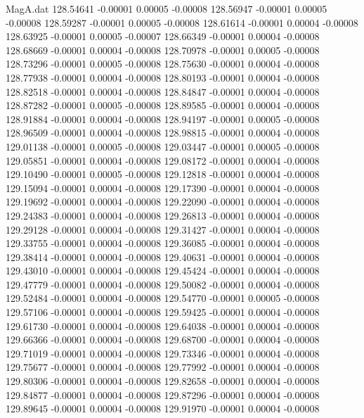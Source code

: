 \begin{filecontents}{MagA.dat}
 128.54641   -0.00001    0.00005   -0.00008
 128.56947   -0.00001    0.00005   -0.00008
 128.59287   -0.00001    0.00005   -0.00008
 128.61614   -0.00001    0.00004   -0.00008
 128.63925   -0.00001    0.00005   -0.00007
 128.66349   -0.00001    0.00004   -0.00008
 128.68669   -0.00001    0.00004   -0.00008
 128.70978   -0.00001    0.00005   -0.00008
 128.73296   -0.00001    0.00005   -0.00008
 128.75630   -0.00001    0.00004   -0.00008
 128.77938   -0.00001    0.00004   -0.00008
 128.80193   -0.00001    0.00004   -0.00008
 128.82518   -0.00001    0.00004   -0.00008
 128.84847   -0.00001    0.00004   -0.00008
 128.87282   -0.00001    0.00005   -0.00008
 128.89585   -0.00001    0.00004   -0.00008
 128.91884   -0.00001    0.00004   -0.00008
 128.94197   -0.00001    0.00005   -0.00008
 128.96509   -0.00001    0.00004   -0.00008
 128.98815   -0.00001    0.00004   -0.00008
 129.01138   -0.00001    0.00005   -0.00008
 129.03447   -0.00001    0.00005   -0.00008
 129.05851   -0.00001    0.00004   -0.00008
 129.08172   -0.00001    0.00004   -0.00008
 129.10490   -0.00001    0.00005   -0.00008
 129.12818   -0.00001    0.00004   -0.00008
 129.15094   -0.00001    0.00004   -0.00008
 129.17390   -0.00001    0.00004   -0.00008
 129.19692   -0.00001    0.00004   -0.00008
 129.22090   -0.00001    0.00004   -0.00008
 129.24383   -0.00001    0.00004   -0.00008
 129.26813   -0.00001    0.00004   -0.00008
 129.29128   -0.00001    0.00004   -0.00008
 129.31427   -0.00001    0.00004   -0.00008
 129.33755   -0.00001    0.00004   -0.00008
 129.36085   -0.00001    0.00004   -0.00008
 129.38414   -0.00001    0.00004   -0.00008
 129.40631   -0.00001    0.00004   -0.00008
 129.43010   -0.00001    0.00004   -0.00008
 129.45424   -0.00001    0.00004   -0.00008
 129.47779   -0.00001    0.00004   -0.00008
 129.50082   -0.00001    0.00004   -0.00008
 129.52484   -0.00001    0.00004   -0.00008
 129.54770   -0.00001    0.00005   -0.00008
 129.57106   -0.00001    0.00004   -0.00008
 129.59425   -0.00001    0.00004   -0.00008
 129.61730   -0.00001    0.00004   -0.00008
 129.64038   -0.00001    0.00004   -0.00008
 129.66366   -0.00001    0.00004   -0.00008
 129.68700   -0.00001    0.00004   -0.00008
 129.71019   -0.00001    0.00004   -0.00008
 129.73346   -0.00001    0.00004   -0.00008
 129.75677   -0.00001    0.00004   -0.00008
 129.77992   -0.00001    0.00004   -0.00008
 129.80306   -0.00001    0.00004   -0.00008
 129.82658   -0.00001    0.00004   -0.00008
 129.84877   -0.00001    0.00004   -0.00008
 129.87296   -0.00001    0.00004   -0.00008
 129.89645   -0.00001    0.00004   -0.00008
 129.91970   -0.00001    0.00004   -0.00008

\end{filecontents}
